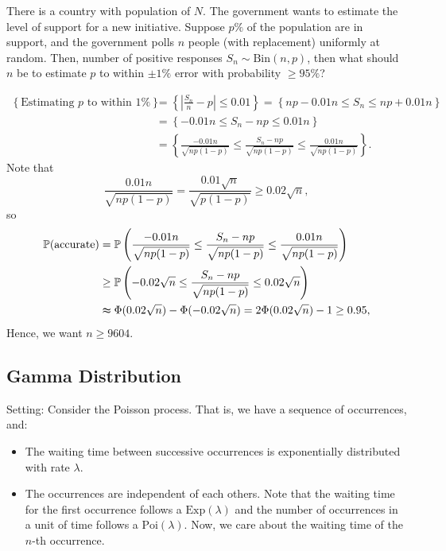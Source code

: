 \begin{eg}
    There is a country with population of \(N\). The government wants to estimate the level of support for a new initiative. Suppose \(p \%\) of the population are in support, and the government polls \(n\) people (with replacement) uniformly at random. Then, number of positive responses \(S_n \sim \mathrm{Bin}(n, p) \), then what should \(n\) be to estimate \(p\) to within \(\pm 1 \%\) error with probability \(\ge 95\%\)?      
\end{eg}

\begin{answer}
    \begin{align*}
        \left\{ \text{Estimating } p \text{ to within } 1 \%   \right\} &= \left\{ \left\vert \frac{S_n}{n} - p \right\vert \le 0.01 \right\} = \left\{ np - 0.01n \le S_n \le np + 0.01n \right\} \\
        &= \left\{ -0.01 n \le S_n - np \le 0.01n \right\} \\
        &= \left\{ \frac{-0.01n}{\sqrt{np(1-p)} } \le \frac{S_n - np}{\sqrt{np(1 - p)} } \le \frac{0.01n}{\sqrt{np(1-p)} } \right\}.  
    \end{align*}
    Note that 
    \[
        \frac{0.01 n}{\sqrt{np(1-p)} } = \frac{0.01 \sqrt{n} }{\sqrt{p(1-p)} } \ge 0.02 \sqrt{n}, 
    \]
    so 
    \begin{align*}
        \mathbb{P} (\text{accurate} ) &= \mathbb{P} \left( \frac{-0.01n}{\sqrt{np(1-p)} } \le \frac{S_n - np}{\sqrt{np(1 - p)} } \le \frac{0.01n}{\sqrt{np(1-p)} } \right) \\ &\ge \mathbb{P} \left( -0.02 \sqrt{n} \le \frac{S_n - np}{\sqrt{np(1-p)} } \le 0.02\sqrt{n}   \right) \\
        &\thickapprox \Phi (0.02 \sqrt{n} ) - \Phi (-0.02\sqrt{n} ) = 2 \Phi (0.02\sqrt{n} ) - 1 \ge 0.95,
    \end{align*}
    Hence, we want \(n \ge 9604\). 
\end{answer}

\subsection{Gamma Distribution}
Setting: Consider the Poisson process. That is, we have a sequence of occurrences, and:
\begin{itemize}
    \item [1.] The waiting time between successive occurrences is exponentially distributed with rate \(\lambda \).
    \item [2.] The occurrences are independent of each others. Note that the waiting time for the first occurrence follows a \(\mathrm{Exp}(\lambda ) \) and the number of occurrences in a unit of time follows a \(\mathrm{Poi}(\lambda) \). Now, we care about the waiting time of the \(n\)-th occurrence.
\end{itemize}

